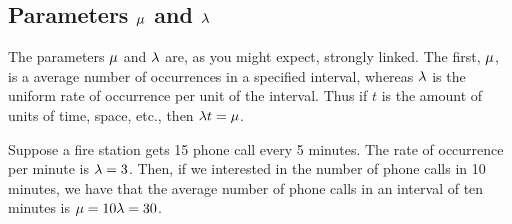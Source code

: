 \subsection{Parameters $\mu$ and $\lambda$}
The parameters $\mu$ and $\lambda$ are, as you might expect, strongly linked. The first, $\mu$, is a average number of occurrences in a specified interval, whereas $\lambda$ is the uniform rate of occurrence per unit of the interval. Thus if $t$ is the amount of units of time, space, etc., then $\lambda t = \mu$.
\begin{example}
    Suppose a fire station gets 15 phone call every 5 minutes. The rate of occurrence per minute is $\lambda = 3$. Then, if we interested in the number of phone calls in 10 minutes, we have that the average number of phone calls in an interval of ten minutes is $\mu = 10\lambda = 30$.
\end{example}
